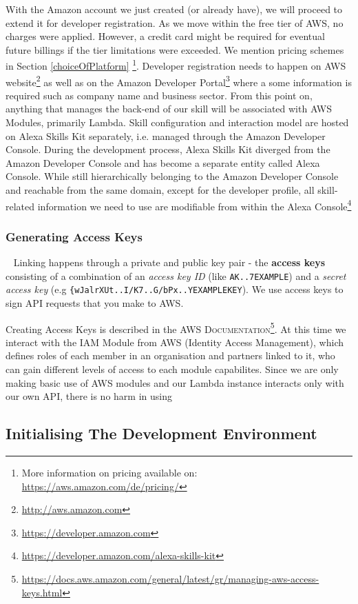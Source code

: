 With the Amazon account we just created (or already have), we will proceed to extend it for developer registration. As we move within the free tier of AWS, no charges were applied. However, a credit card might be required for eventual future billings if the tier limitations were exceeded. We mention pricing schemes in Section \ref{choiceOfPlatform} \footnote{More information on pricing available on: \url{https://aws.amazon.com/de/pricing/}}. Developer registration needs to happen on AWS website\footnote{\url{http://aws.amazon.com}} as well as on the Amazon Developer Portal\footnote{\url{https://developer.amazon.com}} where a some information is required such as company name and business sector. From this point on, anything that manages the back-end of our skill will be associated with AWS Modules, primarily Lambda. Skill configuration and interaction model are hosted on Alexa Skills Kit separately, i.e. managed through the Amazon Developer Console. During the development process, Alexa Skills Kit diverged from the Amazon Developer Console and has become a separate entity called Alexa Console. While still hierarchically belonging to the Amazon Developer Console and reachable from the same domain, except for the developer profile, all skill-related information we need to use are modifiable from within the Alexa Console\footnote{\url{https://developer.amazon.com/alexa-skills-kit}}

\subsubsection*{Generating Access Keys}~\label{accesskeys}
Linking happens through a private and public key pair - the \textbf{access keys} consisting of a
combination of an \textit{access key ID} (like \lstinline|AK..7EXAMPLE|) and a \textit{secret access key} (e.g \lstinline|{wJalrXUt..I/K7..G/bPx..YEXAMPLEKEY|). We use access keys to sign API requests that you make to AWS.

Creating Access Keys is described in the \textsc{AWS Documentation}\footnote{\url{https://docs.aws.amazon.com/general/latest/gr/managing-aws-access-keys.html}}. At this time we interact with the IAM Module from AWS (Identity Access Management), which defines roles of each member in an organisation and partners linked to it, who can gain different levels of access to each module capabilites. Since we are only making basic use of AWS modules and our Lambda instance interacts only with our own API, there is no harm in using 


\subsection*{Initialising The Development Environment}

